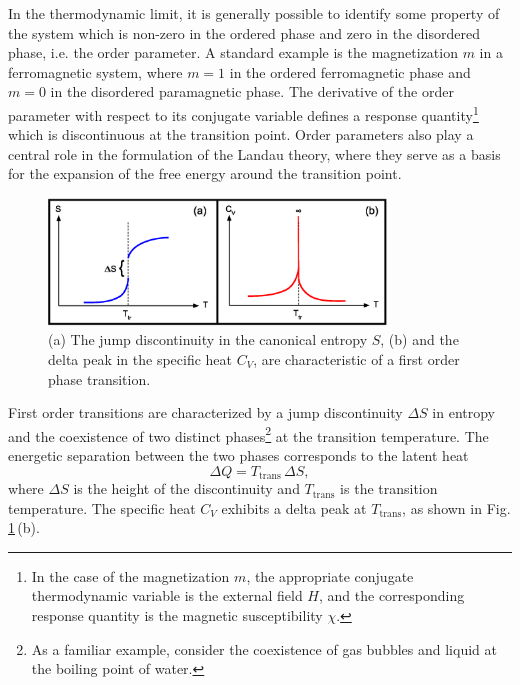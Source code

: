 \documentclass[12pt]{report}
\begin{document}
In the thermodynamic limit, it is generally possible to identify some property of the system which is non-zero in the ordered phase and zero in the disordered phase, i.e. the order parameter\cite{Bachmann2014,Landau2000}. A standard example is the magnetization $m$ in a ferromagnetic system, where $m = 1$ in the ordered ferromagnetic phase and $m = 0$ in the disordered paramagnetic phase. The derivative of the order parameter with respect to its conjugate variable defines a response quantity\footnote{In the case of the magnetization $m$, the appropriate conjugate thermodynamic variable is the external field $H$, and the corresponding response quantity is the magnetic susceptibility $\chi$.} which is discontinuous at the transition point. Order parameters also play a central role in the formulation of the Landau theory, where they serve as a basis for the expansion of the free energy around the transition point\cite{Kardar2009}. 

\begin{figure}
\center
\includegraphics[width = 0.8\textwidth]{chapter2Figs/CanonicalFirstOrder.eps}
\caption{\label{fig:Fig_3}%
(a) The jump discontinuity in the canonical entropy $S$, (b) and the delta peak in the specific heat $C_{V}$, are characteristic of a first order phase transition.}
\end{figure} 

First order transitions are characterized by a jump discontinuity $\Delta S$ in entropy and the coexistence of two distinct phases\footnote{As a familiar example, consider the coexistence of gas bubbles and liquid at the boiling point of water.} at the transition temperature. The energetic separation between the two phases corresponds to the latent heat
\begin{equation}
\Delta Q = T_{\mathrm{trans}}\,\Delta S,
\end{equation}
where $\Delta S$ is the height of the discontinuity and $T_{\mathrm{trans}}$ is the transition temperature. The specific heat $C_{V}$ exhibits a delta peak at $T_{\mathrm{trans}}$, as shown in Fig. \ref{fig:Fig_3}\,(b).
\end{document}
